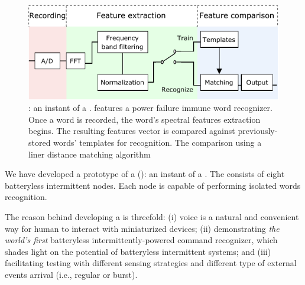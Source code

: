\begin{figure}
	\centering
	\includegraphics[width=\columnwidth]{figures/cis}
	\caption{\fullCIM: an instant of a \fullsys. \cim features a power failure immune word recognizer. Once a word is recorded, the word's spectral features extraction begins. The resulting features vector is compared against previously-stored words' templates for recognition. The comparison using a liner distance matching algorithm}
	\label{fig:cis}
\end{figure}

We have developed a prototype of a \fullcim (\cim): an instant of a \fullsys. The \cim consists of eight batteryless intermittent nodes. Each node is capable of performing isolated words recognition. 

The reason behind developing a \cim is threefold: (i) voice is a natural and convenient way for human to interact with miniaturized devices; (ii) demonstrating \textit{the world's first} batteryless intermittently-powered command recognizer, which shades light on the potential of batteryless intermittent systems; and (iii) facilitating testing with different sensing strategies and different type of external events arrival (i.e., regular  or burst). 




